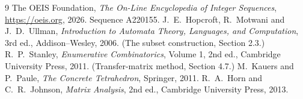 \documentclass[11pt,a4paper]{article}
\theoremstyle{plain}
\theoremstyle{definition}
\begin{document}
\begin{thebibliography}{9}
 The OEIS Foundation, \emph{The On-Line Encyclopedia of Integer
Sequences}, \url{https://oeis.org}, 2026. Sequence A220155.
 J.~E.~Hopcroft, R.~Motwani and J.~D.~Ullman, \emph{Introduction to Automata
Theory, Languages, and Computation}, 3rd ed., Addison--Wesley, 2006. (The subset
construction, Section 2.3.)
 R.~P.~Stanley, \emph{Enumerative Combinatorics}, Volume 1, 2nd ed.,
Cambridge University Press, 2011. (Transfer-matrix method, Section 4.7.)
 M.~Kauers and P.~Paule, \emph{The Concrete Tetrahedron}, Springer, 2011.
 R.~A.~Horn and C.~R.~Johnson, \emph{Matrix Analysis}, 2nd ed., Cambridge
University Press, 2013.
\end{thebibliography}
\end{document}
